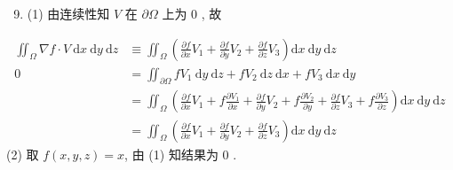 \documentclass[10pt]{article}
\begin{document}
\begin{enumerate}
  \setcounter{enumi}{8}
  \item (1)  由连续性知  $V$  在  $\partial \Omega$  上为  0 ,  故 
\end{enumerate}
$$
\begin{aligned}
\iint_{\Omega} \nabla f \cdot V \mathrm{~d} x \mathrm{~d} y \mathrm{~d} z & \equiv \iint_{\Omega}\left(\frac{\partial f}{\partial x} V_{1}+\frac{\partial f}{\partial y} V_{2}+\frac{\partial f}{\partial z} V_{3}\right) \mathrm{d} x \mathrm{~d} y \mathrm{~d} z \\
0 &=\iint_{\partial \Omega} f V_{1} \mathrm{~d} y \mathrm{~d} z+f V_{2} \mathrm{~d} z \mathrm{~d} x+f V_{3} \mathrm{~d} x \mathrm{~d} y \\
&=\iint_{\Omega}\left(\frac{\partial f}{\partial x} V_{1}+f \frac{\partial V_{1}}{\partial x}+\frac{\partial f}{\partial y} V_{2}+f \frac{\partial V_{2}}{\partial y}+\frac{\partial f}{\partial z} V_{3}+f \frac{\partial V_{3}}{\partial z}\right) \mathrm{d} x \mathrm{~d} y \mathrm{~d} z \\
&=\iint_{\Omega}\left(\frac{\partial f}{\partial x} V_{1}+\frac{\partial f}{\partial y} V_{2}+\frac{\partial f}{\partial z} V_{3}\right) \mathrm{d} x \mathrm{~d} y \mathrm{~d} z
\end{aligned}
$$
(2)  取  $f(x, y, z)=x$,  由  (1)  知结果为  0 .
\end{document}
